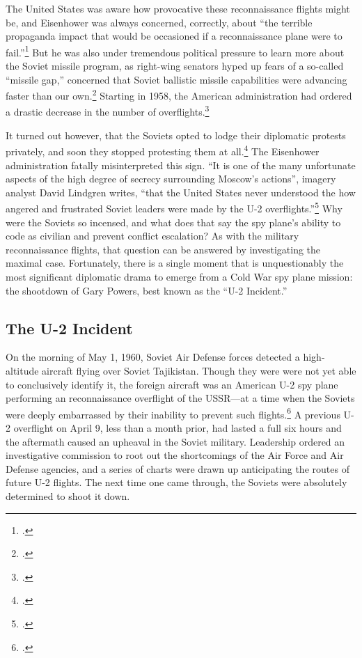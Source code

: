 \documentclass{report}
\begin{document}
\begin{refsegment}
The United States was aware how provocative these reconnaissance flights might be, and Eisenhower was always concerned, correctly, about ``the terrible propaganda impact that would be occasioned if a reconnaissance plane were to fail.''\footcite[p.~162]{pedlow_cia_1998} But he was also under tremendous political pressure to learn more about the Soviet missile program, as right-wing senators hyped up fears of a so-called ``missile gap,'' concerned that Soviet ballistic missile capabilities were advancing faster than our own.\footcite[Fears of this missile gap quickly followed earlier fears of a ``bomber gap,'' which ironically the U-2 had been critical in disproving.]{licklider_missile_1970} Starting in 1958, the American administration had ordered a drastic decrease in the number of overflights.\footcite[p.~51]{powers_operation_2004}

It turned out however, that the Soviets opted to lodge their diplomatic protests privately, and soon they stopped protesting them at all.\footcite[p.~42]{lindgren_trust_2000} The Eisenhower administration fatally misinterpreted this sign. ``It is one of the many unfortunate aspects of the high degree of secrecy surrounding Moscow's actions'', imagery analyst David Lindgren writes, ``that the United States never understood the how angered and frustrated Soviet leaders were made by the U-2 overflights.''\footcite[p.~52]{lindgren_trust_2000} Why were the Soviets so incensed, and what does that say the spy plane's ability to code as civilian and prevent conflict escalation? As with the military reconnaissance flights, that question can be answered by investigating the maximal case. Fortunately, there is a single moment that is unquestionably the most significant diplomatic drama to emerge from a Cold War spy plane mission: the shootdown of Gary Powers, best known as the ``U-2 Incident.''

\subsection{The U-2 Incident}
On the morning of May 1, 1960, Soviet Air Defense forces detected a high-altitude aircraft flying over Soviet Tajikistan. Though they were were not yet able to conclusively identify it, the foreign aircraft was an American U-2 spy plane performing an reconnaissance overflight of the USSR---at a time when the Soviets were deeply embarrassed by their inability to prevent such flights.\footcite{orlov_u-2_2007} A previous U-2 overflight on April 9, less than a month prior, had lasted a full six hours and the aftermath caused an upheaval in the Soviet military. Leadership ordered an investigative commission to root out the shortcomings of the Air Force and Air Defense agencies, and a series of charts were drawn up anticipating the routes of future U-2 flights. The next time one came through, the Soviets were absolutely determined to shoot it down.


\end{refsegment}
\end{document}
